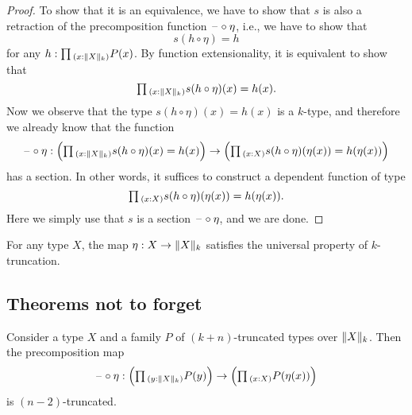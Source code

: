 \begin{proof}
  To show that it is an equivalence, we have to show that $s$ is also a retraction of the precomposition function $\blank\circ\eta$, i.e., we have to show that
  \begin{equation*}
    s(h\circ\eta)= h
  \end{equation*}
  for any $h:\prd{x:\trunc{k}{X}}P(x)$. By function extensionality, it is equivalent to show that
  \begin{equation*}
    \prd{x:\trunc{k}{X}}s(h\circ\eta)(x)=h(x).
  \end{equation*}
  Now we observe that the type $s(h\circ\eta)(x)=h(x)$ is a $k$-type, and therefore we already know that the function
  \begin{equation*}
    \blank\circ\eta:\Big(\prd{x:\trunc{k}{X}}s(h\circ\eta)(x)=h(x)\Big)\to \Big(\prd{x:X}s(h\circ\eta)(\eta(x))=h(\eta(x))\Big)
  \end{equation*}
  has a section. In other words, it suffices to construct a dependent function of type
  \begin{equation*}
    \prd{x:X}s(h\circ\eta)(\eta(x))=h(\eta(x)).
  \end{equation*}
  Here we simply use that $s$ is a section $\blank\circ\eta$, and we are done.
\end{proof}

\begin{cor}\label{cor:k-type-is-reflective-subuniverse}
  For any type $X$, the map $\eta:X\to\trunc{k}{X}$ satisfies the universal property of $k$-truncation. 
\end{cor}

\subsection{Theorems not to forget}

\begin{thm}
  Consider a type $X$ and a family $P$ of $(k+n)$-truncated types over $\trunc{k}{X}$. Then the precomposition map
  \begin{equation*}
    \blank\circ\eta : \Big(\prd{y:\trunc{k}{X}}P(y)\Big)\to\Big(\prd{x:X}P(\eta(x))\Big)
  \end{equation*}
  is $(n-2)$-truncated.
\end{thm}

